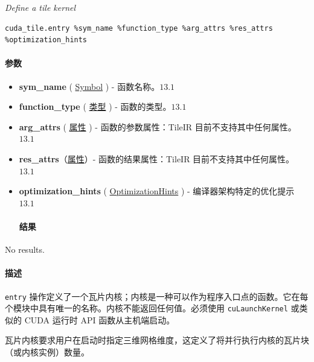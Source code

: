 \documentclass{article}
\begin{document}
\textit{Define a tile kernel}


\begin{lstlisting}
cuda_tile.entry %sym_name %function_type %arg_attrs %res_attrs %optimization_hints
\end{lstlisting}

\paragraph{参数}

\begin{itemize}
\item \textbf{sym\_name} ( \href{https://docs.nvidia.com/cuda/tile-ir/latest/sections/operations.html#type-symbol}{Symbol} ) - 函数名称。$\boxed{13.1}$
\item \textbf{function\_type} ( \href{https://docs.nvidia.com/cuda/tile-ir/latest/sections/operations.html#type-type}{类型} ) - 函数的类型。$\boxed{13.1}$
\item \textbf{arg\_attrs} ( \href{https://docs.nvidia.com/cuda/tile-ir/latest/sections/operations.html#type-attributes}{属性} ) - 函数的参数属性：TileIR 目前不支持其中任何属性。$\boxed{13.1}$
\item \textbf{res\_attrs}（\href{https://docs.nvidia.com/cuda/tile-ir/latest/sections/operations.html#type-attributes}{属性}）- 函数的结果属性：TileIR 目前不支持其中任何属性。$\boxed{13.1}$
\item \textbf{optimization\_hints} ( \href{https://docs.nvidia.com/cuda/tile-ir/latest/sections/operations.html#op-attribute-cuda-tile-entry-optimizationhints-attr}{OptimizationHints} ) - 编译器架构特定的优化提示 $\boxed{13.1}$


\paragraph{结果}

\end{itemize}
No results.



\paragraph{描述}

\texttt{entry} 操作定义了一个瓦片内核；内核是一种可以作为程序入口点的函数。它在每个模块中具有唯一的名称。内核不能返回任何值。必须使用 \texttt{cuLaunchKernel} 或类似的 CUDA 运行时 API 函数从主机端启动。


瓦片内核要求用户在启动时指定三维网格维度，这定义了将并行执行内核的瓦片块（或内核实例）数量。
\end{document}
